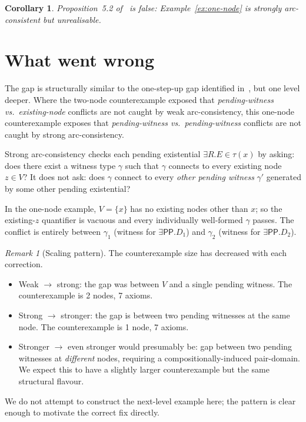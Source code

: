 \documentclass[11pt]{article}
\newtheorem{corollary}[theorem]{Corollary}
\theoremstyle{definition}
\theoremstyle{remark}
\newtheorem{remark}[theorem]{Remark}
\newcommand{\PP}{\mathsf{PP}}
\begin{document}
\begin{corollary}
Proposition~5.2 of~\cite{CounterEx2} is false:
Example~\ref{ex:one-node} is strongly arc-consistent but
unrealisable.
\end{corollary}

\section{What went wrong}
\label{sec:analysis}

The gap is structurally similar to the one-step-up gap identified
in~\cite{CounterEx2}, but one level deeper.  Where the two-node
counterexample exposed that \emph{pending-witness vs.\ existing-node}
conflicts are not caught by weak arc-consistency, this
one-node counterexample exposes that \emph{pending-witness
vs.\ pending-witness} conflicts are not caught by strong
arc-consistency.

Strong arc-consistency checks each pending existential
$\exists R. E \in \tau(x)$ by asking: does there exist a witness
type $\gamma$ such that $\gamma$ connects to every existing node
$z \in V$?  It does not ask: does $\gamma$ connect to every
\emph{other pending witness} $\gamma'$ generated by some other
pending existential?

In the one-node example, $V = \{x\}$ has no existing nodes other
than $x$; so the existing-$z$ quantifier is vacuous and every
individually well-formed $\gamma$ passes.  The conflict is entirely
between $\gamma_1$ (witness for $\exists \PP. D_1$) and $\gamma_2$
(witness for $\exists \PP. D_2$).

\begin{remark}[Scaling pattern]
The counterexample size has decreased with each correction.
\begin{itemize}
  \item Weak $\to$ strong: the gap was between $V$ and a single
    pending witness.  The counterexample is 2 nodes, 7 axioms.
  \item Strong $\to$ stronger: the gap is between two pending
    witnesses at the same node.  The counterexample is 1 node,
    7 axioms.
  \item Stronger $\to$ even stronger would presumably be: gap between
    two pending witnesses at \emph{different} nodes, requiring a
    compositionally-induced pair-domain.  We expect this to have a
    slightly larger counterexample but the same structural flavour.
\end{itemize}
We do not attempt to construct the next-level example here; the
pattern is clear enough to motivate the correct fix directly.
\end{remark}
\end{document}
